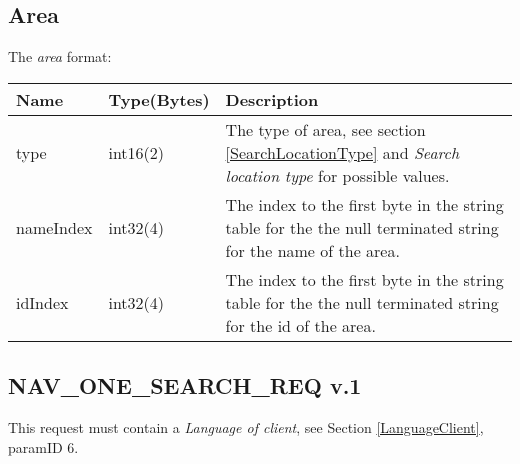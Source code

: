 \documentclass[a4paper]{article}
\begin{document}
\subsection{Area}
\label{Area}

The \emph{area} format: \\
\begin{tabular}{|l|l|p{60mm}|}
  \hline
  \textbf{Name} & \textbf{Type(Bytes)} & \textbf{Description} \\\hline
  type      & int16(2)     & The type of area, see section
                            \ref{SearchLocationType} and \emph{Search location
                            type} for possible values. \\\hline
  nameIndex & int32(4)    & The index to the first byte in the string 
                            table for the the null terminated string for
                            the name of the area. \\\hline
  idIndex   & int32(4)     & The index to the first byte in the string 
                             table for the the null terminated string for the
                             id of the area.  \\\hline
\end{tabular}



\subsection{NAV\_ONE\_SEARCH\_REQ v.1}

This request must contain a \emph{Language of client}, see Section 
\ref{LanguageClient}, paramID 6.
\end{document}
